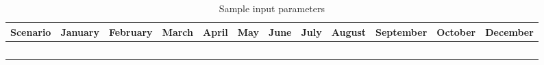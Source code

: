 \begin{table}
\label{tab:Sampleinputparameters}
\begin{tabular}{lccccc}
\hline 
Scenario & January & February & March & April  & May &June&July&August&September&October &December\\
\hline \

\hline 
\end{tabular}
\caption{Sample input parameters }
\end{table}